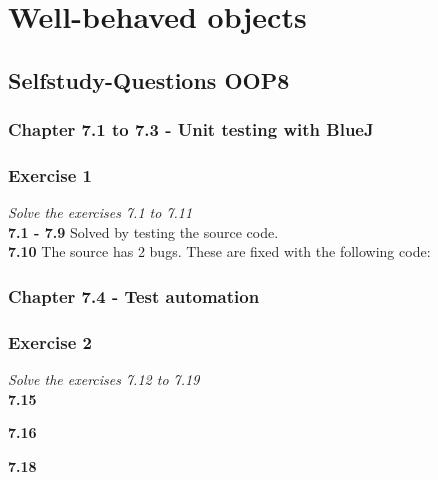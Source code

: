 \section{Well-behaved objects}


\subsection{Selfstudy-Questions OOP8}

\subsubsection{Chapter 7.1 to 7.3 - Unit testing with BlueJ}

\subsubsection*{Exercise 1}
\textit{Solve the exercises 7.1 to 7.11} \\

\textbf{7.1 - 7.9} Solved by testing the source code. \\

\textbf{7.10} The source has 2 bugs. These are fixed with the following code:





\subsubsection{Chapter 7.4 - Test automation}

\subsubsection*{Exercise 2}
\textit{Solve the exercises 7.12 to 7.19} \\

\textbf{7.15}  

\textbf{7.16}  

\textbf{7.18} 

